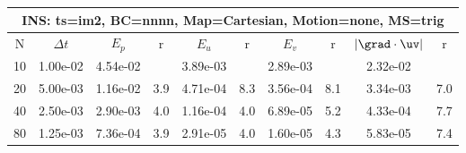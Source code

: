 
\begin{tabular}{|c|c|c|c|c|c|c|c|c|c|} \hline
 \multicolumn{10}{|c|}{INS: ts=im2, BC=nnnn, Map=Cartesian, Motion=none, MS=trig } \\ \hline 
     N  &   $\Delta t$ & $E_p$   &  r  &   $E_u$   &   r    &   $E_v$   & r   &  $|\grad\cdot\uv|$  & r   \\ \hline 
  10   &  1.00e-02  &   4.54e-02  &        &   3.89e-03  &        &   2.89e-03  &        &   2.32e-02  &        \\ 
  20   &  5.00e-03  &   1.16e-02  & 3.9  &   4.71e-04  & 8.3  &   3.56e-04  & 8.1  &   3.34e-03  & 7.0  \\ 
  40   &  2.50e-03  &   2.90e-03  & 4.0  &   1.16e-04  & 4.0  &   6.89e-05  & 5.2  &   4.33e-04  & 7.7  \\ 
  80   &  1.25e-03  &   7.36e-04  & 3.9  &   2.91e-05  & 4.0  &   1.60e-05  & 4.3  &   5.83e-05  & 7.4  \\ 
 \hline 
\end{tabular}
